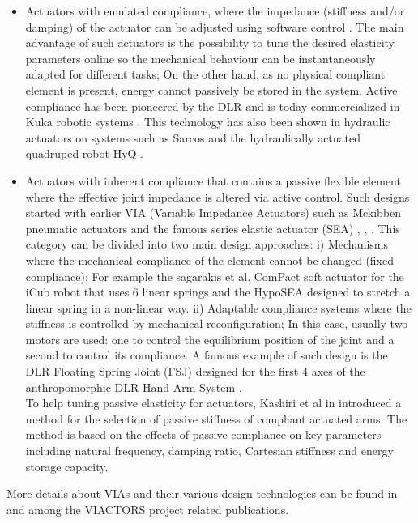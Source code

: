 \begin{itemize}
\item Actuators with emulated compliance, where the impedance (stiffness and/or damping) of the actuator can be adjusted using software control \cite{loughlin2007dlr}. The main advantage of such actuators is the possibility to tune the desired elasticity parameters online so the mechanical behaviour can be instantaneously adapted for different tasks; On the other hand, as no physical compliant element is present, energy cannot passively be stored in the system. Active compliance has been pioneered by the DLR and is today commercialized in Kuka robotic systems \cite{bischoff2010kuka}. This technology has also been shown in hydraulic actuators on systems such as Sarcos \cite{hyon2007full} and the hydraulically actuated quadruped robot HyQ \cite{boaventura2012dynamic}.
\item Actuators with inherent compliance that contains a passive flexible element where the effective joint impedance is altered via active control. Such designs started with earlier VIA (Variable Impedance Actuators) such as Mckibben pneumatic actuators \cite{caldwell1995control} and the famous series elastic actuator (SEA) \cite{pratt1995series}, \cite{laffranchi2011compact}, \cite{vanderborght2013variable}. This category can be divided into two main design approaches: i) Mechanisms where the mechanical compliance of the element cannot be changed (fixed compliance); For example the sagarakis et al. \cite{tsagarakis2009compact} ComPact soft actuator for the iCub robot that uses 6 linear springs and the HypoSEA \cite{ivar2011nonlinear} designed to stretch a linear spring in a non-linear way. ii) Adaptable compliance systems where the stiffness is controlled by mechanical reconfiguration; In this case, usually two motors are used: one to control the equilibrium position of the joint and a second to control its compliance. A famous example of such design is the DLR
Floating Spring Joint (FSJ) \cite{wolf2011dlr} designed for the first 4 axes of the anthropomorphic DLR Hand Arm System \cite{}. \\
To help tuning passive elasticity for actuators, Kashiri et al in \cite{kashiri2013stiffness} introduced a method for the selection of passive stiffness of compliant actuated arms. The method is based on the effects of passive compliance on key parameters including natural frequency, damping ratio, Cartesian stiffness and energy storage capacity.
\end{itemize}
More details about VIAs and their various design technologies can be found in \cite{vanderborght2013variable} and among the VIACTORS project \cite{viactors} related publications.  

